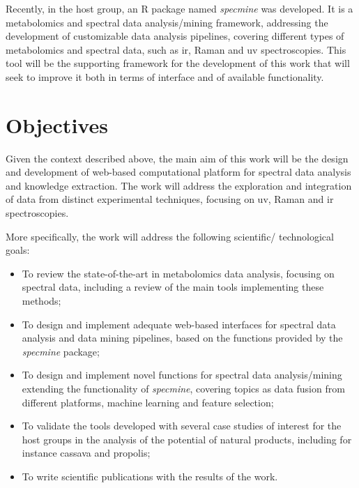 Recently, in the host group, an R package named \textit{specmine} \citep{costa2016r} was developed. It is a metabolomics and spectral data analysis/mining framework, addressing the development of customizable data analysis pipelines, covering different types of metabolomics and spectral data, such as \gls{ir}, Raman and \gls{uv} spectroscopies. This tool will be the supporting framework for the development of this work that will seek to improve it both in terms of interface and of available functionality.


\section{Objectives}

Given the context described above, the main aim of this work will be the design and development of web-based computational platform for spectral data analysis and knowledge extraction. The work will address the exploration and integration of data from distinct experimental techniques, focusing on \gls{uv}, Raman and \gls{ir} spectroscopies. 

More specifically, the work will address the following scientific/ technological goals:

\begin{itemize}
	\item To review the state-of-the-art in metabolomics data analysis, focusing on spectral data, including a review of the main tools implementing these methods;
	\item To design and implement adequate web-based interfaces for spectral data analysis and data mining pipelines, based on the functions provided by the \textit{specmine} package;
	\item To design and implement novel functions for spectral data analysis/mining extending the functionality of \textit{specmine}, covering topics as data fusion from different platforms, machine learning and feature selection;
	\item To validate the tools developed with several case studies of interest for the host groups in the analysis of the potential of natural products, including for instance cassava and propolis;
	\item To write scientific publications with the results of the work.
\end{itemize}


